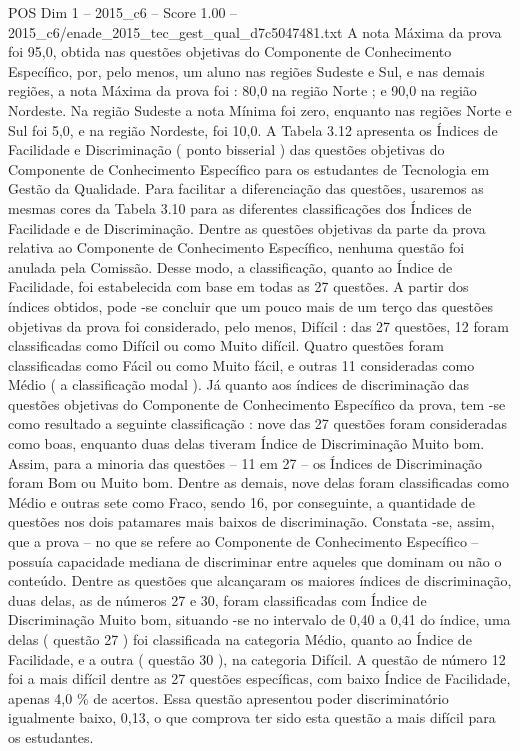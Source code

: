 \begin{textsample}{POS Dim 1 – 2015\_c6 – Score 1.00 – 2015\_c6/enade\_2015\_tec\_gest\_qual\_d7c5047481.txt}
A nota Máxima da prova foi 95,0, obtida nas questões objetivas do Componente de Conhecimento Específico, por, pelo menos, um aluno nas regiões Sudeste e Sul, e nas demais regiões, a nota Máxima da prova foi : 80,0 na região Norte ; e 90,0 na região Nordeste.
Na região Sudeste a nota Mínima foi zero, enquanto nas regiões Norte e Sul foi 5,0, e na região Nordeste, foi 10,0.
A Tabela 3.12 apresenta os Índices de Facilidade e Discriminação ( ponto bisserial ) das questões objetivas do Componente de Conhecimento Específico para os estudantes de Tecnologia em Gestão da Qualidade.
Para facilitar a diferenciação das questões, usaremos as mesmas cores da Tabela 3.10 para as diferentes classificações dos Índices de Facilidade e de Discriminação.
Dentre as questões objetivas da parte da prova relativa ao Componente de Conhecimento Específico, nenhuma questão foi anulada pela Comissão.
Desse modo, a classificação, quanto ao Índice de Facilidade, foi estabelecida com base em todas as 27 questões.
A partir dos índices obtidos, pode -se concluir que um pouco mais de um terço das questões objetivas da prova foi considerado, pelo menos, Difícil : das 27 questões, 12 foram classificadas como Difícil ou como Muito difícil.
Quatro questões foram classificadas como Fácil ou como Muito fácil, e outras 11 consideradas como Médio ( a classificação modal ).
Já quanto aos índices de discriminação das questões objetivas do Componente de Conhecimento Específico da prova, tem -se como resultado a seguinte classificação : nove das 27 questões foram consideradas como boas, enquanto duas delas tiveram Índice de Discriminação Muito bom.
Assim, para a minoria das questões – 11 em 27 – os Índices de Discriminação foram Bom ou Muito bom.
Dentre as demais, nove delas foram classificadas como Médio e outras sete como Fraco, sendo 16, por conseguinte, a quantidade de questões nos dois patamares mais baixos de discriminação.
Constata -se, assim, que a prova – no que se refere ao Componente de Conhecimento Específico – possuía capacidade mediana de discriminar entre aqueles que dominam ou não o conteúdo.
Dentre as questões que alcançaram os maiores índices de discriminação, duas delas, as de números 27 e 30, foram classificadas com Índice de Discriminação Muito bom, situando -se no intervalo de 0,40 a 0,41 do índice, uma delas ( questão 27 ) foi classificada na categoria Médio, quanto ao Índice de Facilidade, e a outra ( questão 30 ), na categoria Difícil.
A questão de número 12 foi a mais difícil dentre as 27 questões específicas, com baixo Índice de Facilidade, apenas 4,0 \% de acertos.
Essa questão apresentou poder discriminatório igualmente baixo, 0,13, o que comprova ter sido esta questão a mais difícil para os estudantes.

\end{textsample}
